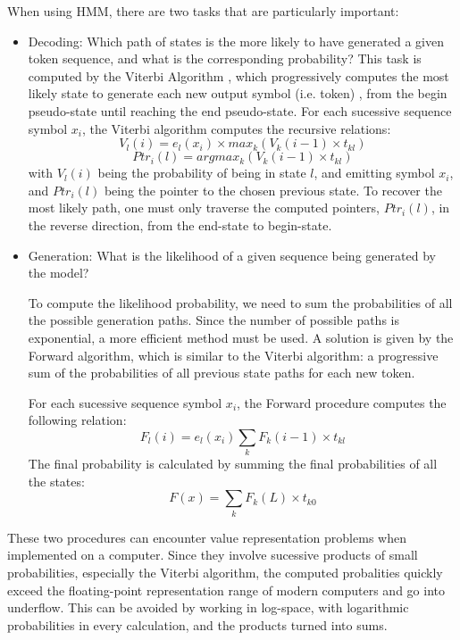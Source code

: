 When using HMM, there are two tasks that are particularly important:
\begin{itemize}
	
	\item Decoding: Which path of states is the more likely to have generated a given token sequence, and what is the corresponding probability?
	This task is computed by the Viterbi Algorithm \cite{viterbi}, which progressively computes the most likely state to generate each new output symbol (i.e. token) , from the begin pseudo-state until reaching the end pseudo-state.	
	For each sucessive sequence symbol $x_i$, the Viterbi algorithm computes the recursive relations:
	$$ V_l(i) = e_l(x_i) \times max_k ( V_k (i-1) \times t_{kl} ) $$
	$$ Ptr_i(l) = argmax_k (V_k (i-1) \times t_{kl} ) $$	
	with $V_l(i)$ being the probability of being in state $l$, and emitting symbol $x_i$, and $Ptr_i(l)$ being the pointer to the chosen previous state.	
	To recover the most likely path, one must only traverse the computed pointers, $Ptr_i(l)$, in the reverse direction, from the end-state to begin-state.	
	
	\item Generation: What is the likelihood of a given sequence being generated by the model?

	To compute the likelihood probability, we need to sum the probabilities of all the possible generation paths. Since the number of possible paths is exponential, a more efficient method must be used. A solution is given by the Forward algorithm, which is similar to the Viterbi algorithm: a progressive sum of the probabilities of all previous state paths for each new token.

	For each sucessive sequence symbol $x_i$, the Forward procedure computes the following relation:
	$$ F_l(i) = e_l(x_i) \sum\limits_k F_k (i-1) \times t_{kl}  $$
	The final probability is calculated by summing the final probabilities of all the states:
	$$ F(x) = \sum\limits_k F_k (L) \times t_{k0}  $$
\end{itemize}

These two procedures can encounter value representation problems when implemented on a computer. Since they involve sucessive products of small probabilities, especially the Viterbi algorithm, the computed probalities quickly exceed the floating-point representation range of modern computers and go into underflow. This can be avoided by working in log-space, with logarithmic probabilities in every calculation, and the products turned into sums.

